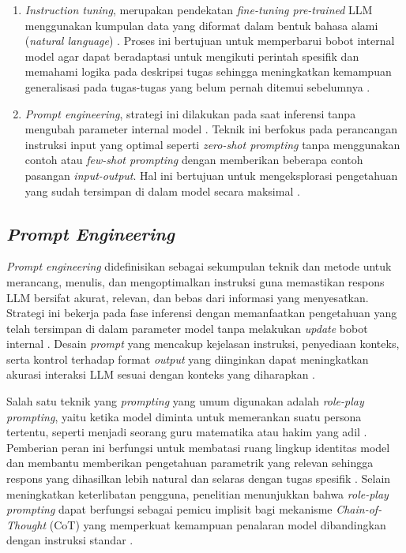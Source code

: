 \begin{enumerate}[nolistsep]
	\item \textit{Instruction tuning}, merupakan pendekatan \textit{fine-tuning pre-trained} LLM menggunakan kumpulan data yang diformat dalam bentuk bahasa alami (\textit{natural language}) \parencite{Zhao2025}. Proses ini bertujuan untuk memperbarui bobot internal model agar dapat beradaptasi untuk mengikuti perintah spesifik dan memahami logika pada deskripsi tugas sehingga meningkatkan kemampuan generalisasi pada tugas-tugas yang belum pernah ditemui sebelumnya \parencite{Cheng2025, Zhao2025, Brickman2025}.

	\item \textit{Prompt engineering}, strategi ini dilakukan pada saat inferensi tanpa mengubah parameter internal model \parencite{Zhao2025}. Teknik ini berfokus pada perancangan instruksi input yang optimal seperti \textit{zero-shot prompting} tanpa menggunakan contoh atau \textit{few-shot prompting} dengan memberikan beberapa contoh pasangan \textit{input-output}. Hal ini bertujuan untuk mengeksplorasi pengetahuan yang sudah tersimpan di dalam model secara maksimal \parencite{Brickman2025}.
\end{enumerate}

\subsection{\textit{Prompt Engineering}}

\textit{Prompt engineering} didefinisikan sebagai sekumpulan teknik dan metode untuk merancang, menulis, dan mengoptimalkan instruksi guna memastikan respons LLM bersifat akurat, relevan, dan bebas dari informasi yang menyesatkan. Strategi ini bekerja pada fase inferensi dengan memanfaatkan pengetahuan yang telah tersimpan di dalam parameter model tanpa melakukan \textit{update} bobot internal \parencite{Brickman2025}. Desain \textit{prompt} yang mencakup kejelasan instruksi, penyediaan konteks, serta kontrol terhadap format \textit{output} yang diinginkan dapat meningkatkan akurasi interaksi LLM sesuai dengan konteks yang diharapkan \parencite{Velsquez-Henao2023}.

Salah satu teknik yang \textit{prompting} yang umum digunakan adalah \textit{role-play prompting}, yaitu ketika model diminta untuk memerankan suatu persona tertentu, seperti menjadi seorang guru matematika atau hakim yang adil \parencite{Kong2024}. Pemberian peran ini berfungsi untuk membatasi ruang lingkup identitas model dan membantu memberikan pengetahuan parametrik yang relevan sehingga respons yang dihasilkan lebih natural dan selaras dengan tugas spesifik \parencite{Tseng2024, Kong2024}. Selain meningkatkan keterlibatan pengguna, penelitian menunjukkan bahwa \textit{role-play prompting} dapat berfungsi sebagai pemicu implisit bagi mekanisme \textit{Chain-of-Thought} (CoT) yang memperkuat kemampuan penalaran model dibandingkan dengan instruksi standar \parencite{Kong2024}.

